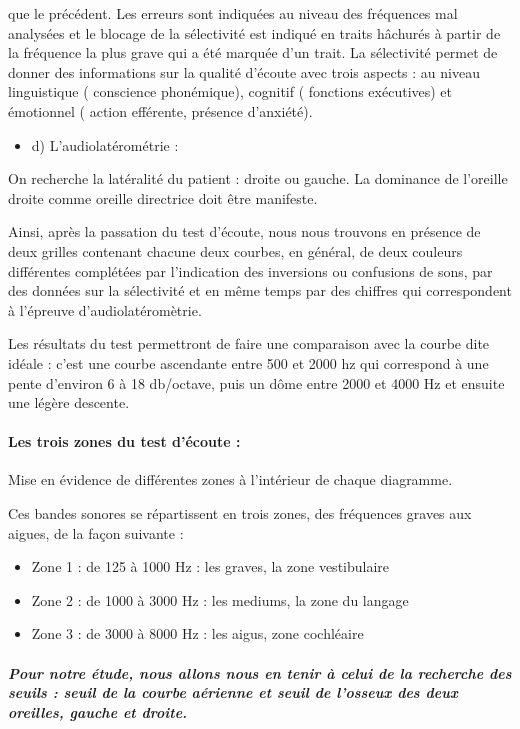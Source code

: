 que le précédent. Les erreurs sont indiquées au niveau des fréquences
mal analysées et le blocage de la sélectivité est indiqué en traits
hâchurés à partir de la fréquence la plus grave qui a été marquée
d'un trait. La sélectivité permet de donner des informations sur la
qualité d'écoute avec trois aspects : au niveau linguistique ( conscience
phonémique), cognitif ( fonctions exécutives) et émotionnel ( action
efférente, présence d'anxiété).
\begin{itemize}
\item d) L'audiolatérométrie : 
\end{itemize}
On recherche la latéralité du patient : droite ou gauche. La dominance
de l'oreille droite comme oreille directrice doit être manifeste.

Ainsi, après la passation du test d\textquoteright écoute, nous nous
trouvons en présence de deux grilles contenant chacune deux courbes,
en général, de deux couleurs différentes complétées par l'indication
des inversions ou confusions de sons, par des données sur la sélectivité
et en même temps par des chiffres qui correspondent à l'épreuve d'audiolatéromètrie.

Les résultats du test permettront de faire une comparaison avec la
courbe dite idéale : c'est une courbe ascendante entre 500 et 2000
hz qui correspond à une pente d\textquoteright environ 6 à 18 db/octave,
puis un dôme entre 2000 et 4000 Hz et ensuite une légère descente. 

\paragraph{Les trois zones du test d'écoute : }

Mise en évidence de différentes zones à l\textquoteright intérieur
de chaque diagramme. 

Ces bandes sonores se répartissent en trois zones, des fréquences
graves aux aigues, de la façon suivante :
\begin{itemize}
\item Zone 1 : de 125 à 1000 Hz : les graves, la zone vestibulaire
\item Zone 2 : de 1000 à 3000 Hz : les mediums, la zone du langage
\item Zone 3 : de 3000 à 8000 Hz : les aigus, zone cochléaire
\end{itemize}

\subparagraph*{Pour notre étude, nous allons nous en tenir à celui de la recherche
des seuils : seuil de la courbe aérienne et seuil de l'osseux des
deux oreilles, gauche et droite.}


